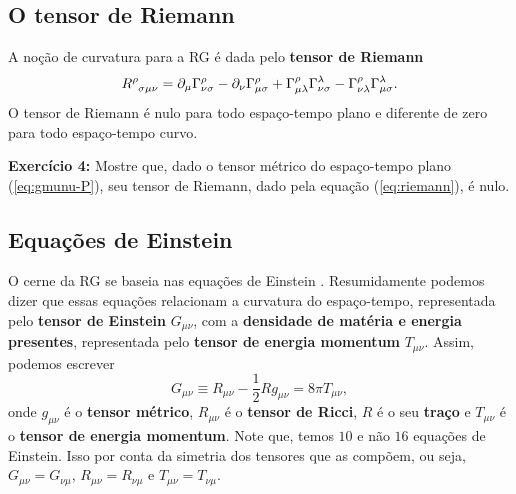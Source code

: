 \documentclass[12pt,a4paper,titlepage,brazil]{article}
\begin{document}

\subsection{O tensor de Riemann}

A noção de curvatura para a RG é dada pelo {\bf tensor de Riemann}
\begin{equation}
 R^{\rho}_{\hspace{0.15cm}\sigma \mu \nu} = \partial_{\mu} \Gamma^{\rho}_{\nu \sigma} 
 - \partial_{\nu} \Gamma^{\rho}_{\mu \sigma} + \Gamma^{\rho}_{\mu \lambda} \Gamma^{\lambda}_{\nu \sigma}
 - \Gamma^{\rho}_{\nu \lambda} \Gamma^{\lambda}_{\mu \sigma} . \label{eq:riemann}
\end{equation}
O tensor de Riemann é nulo para todo espaço-tempo plano e diferente de zero para todo espaço-tempo curvo.\\

\begin{tcolorbox}
  {\bf Exercício 4:} Mostre que, dado o tensor métrico do espaço-tempo plano (\ref{eq:gmunu-P}), seu tensor de Riemann, dado pela equação (\ref{eq:riemann}), é nulo.
\end{tcolorbox}



\subsection{Equações de Einstein}

O cerne da RG se baseia nas equações de Einstein \cite{carroll2004, nightingale2006, hartle2003, dirac1996, wald2010}. Resumidamente podemos dizer que essas equações relacionam a curvatura do espaço-tempo, representada pelo \textbf{tensor de Einstein} $G_{\mu \nu}$, com a {\bf densidade de matéria e energia presentes}, representada pelo \textbf{tensor de energia momentum} $T_{\mu \nu}$. Assim, podemos escrever
\begin{equation}
 G_{\mu \nu} \equiv R_{\mu \nu} - \frac{1}{2} R g_{\mu \nu} = 8 \pi T_{\mu \nu} , \label{eq:EQE}
\end{equation}
onde $g_{\mu \nu}$ é o \textbf{tensor métrico}, $R_{\mu \nu}$ é o \textbf{tensor de Ricci}, $R$ é o seu {\bf traço} e $T_{\mu \nu}$ é o {\bf tensor de energia momentum}. Note que, temos $10$ e não $16$ equações de Einstein. Isso por conta da simetria dos tensores que as compõem, ou seja, $G_{\mu \nu} = G_{\nu \mu}$, $R_{\mu \nu} = R_{\nu \mu}$ e $T_{\mu \nu} = T_{\nu \mu}$.
\end{document}
